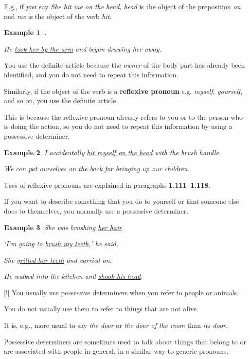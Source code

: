 \documentclass[oneside]{book}
\numberwithin{equation}{section}
\newtheorem{example}{Example}[section]
\begin{document}
E.g., if you say \textit{She hit me on the head, head} is the object of the preposition \textit{on} and \textit{me} is the object of the verb \textit{hit}.
\begin{example}
    .
    
    He \underline{took her by the arm} and began drawing her away.
\end{example}
You use the definite article because the \textit{owner} of the body part has already been identified, and you do not need to repeat this information.

%
Similarly, if the object of the verb is a \textbf{reflexive pronoun} e.g. \textit{myself, yourself}, and so on, you use the definite article.

This is because the reflexive pronoun already refers to you or to the person who is doing the action, so you do not need to repeat this information by using a possessive determiner.
\begin{example}
    I accidentally \underline{hit myself on the head} with the brush handle.
    
    We can \underline{pat ourselves on the back} for bringing up our children.
\end{example}
Uses of reflexive pronouns are explained in paragraphs \textbf{1.111--1.118}.

%
\noindent{} If you want to describe something that you do to yourself or that someone else does to themselves, you normally use a possessive determiner.
\begin{example}
    She was brushing \underline{her hair}.
    
    `I'm going to \underline{brush my teeth},' he said.
    
    She \underline{gritted her teeth} and carried on.
    
    He walked into the kitchen and \underline{shook his head}.
\end{example}

%
\noindent{} [!] You usually use possessive determiners when you refer to people or animals.

You do not usually use them to refer to things that are not alive.

It is, e.g., more usual to say \textit{the door} or \textit{the door of the room} than \textit{its door}.

%
\noindent{} Possessive determiners are sometimes used to talk about things that belong to or are associated with people in general, in a similar way to generic pronouns.
\end{document}
